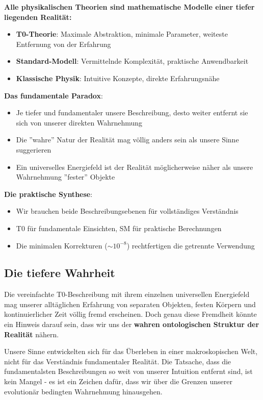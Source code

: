 	\begin{tcolorbox}[colback=purple!5!white,colframe=purple!75!black,title=Kernaussage]
		\textbf{Alle physikalischen Theorien sind mathematische Modelle einer tiefer liegenden Realität:}
		
		\begin{itemize}
			\item \textbf{T0-Theorie}: Maximale Abstraktion, minimale Parameter, weiteste Entfernung von der Erfahrung
			\item \textbf{Standard-Modell}: Vermittelnde Komplexität, praktische Anwendbarkeit
			\item \textbf{Klassische Physik}: Intuitive Konzepte, direkte Erfahrungsnähe
		\end{itemize}
		
		\textbf{Das fundamentale Paradox}:
		\begin{itemize}
			\item Je tiefer und fundamentaler unsere Beschreibung, desto weiter entfernt sie sich von unserer direkten Wahrnehmung
			\item Die ''wahre'' Natur der Realität mag völlig anders sein als unsere Sinne suggerieren
			\item Ein universelles Energiefeld ist der Realität möglicherweise näher als unsere Wahrnehmung ''fester'' Objekte
		\end{itemize}
		
		\textbf{Die praktische Synthese}:
		\begin{itemize}
			\item Wir brauchen beide Beschreibungsebenen für vollständiges Verständnis
			\item T0 für fundamentale Einsichten, SM für praktische Berechnungen
			\item Die minimalen Korrekturen ($\sim 10^{-8}$) rechtfertigen die getrennte Verwendung
		\end{itemize}
	\end{tcolorbox}
	
	\subsection{Die tiefere Wahrheit}
	
	Die vereinfachte T0-Beschreibung mit ihrem einzelnen universellen Energiefeld mag unserer alltäglichen Erfahrung von separaten Objekten, festen Körpern und kontinuierlicher Zeit völlig fremd erscheinen. Doch genau diese Fremdheit könnte ein Hinweis darauf sein, dass wir uns der \textbf{wahren ontologischen Struktur der Realität} nähern.
	
	Unsere Sinne entwickelten sich für das Überleben in einer makroskopischen Welt, nicht für das Verständnis fundamentaler Realität. Die Tatsache, dass die fundamentalsten Beschreibungen so weit von unserer Intuition entfernt sind, ist kein Mangel - es ist ein Zeichen dafür, dass wir über die Grenzen unserer evolutionär bedingten Wahrnehmung hinausgehen.
	

	